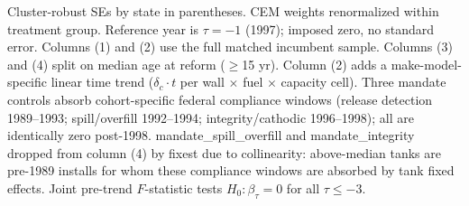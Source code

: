 \par \raggedright 
Cluster-robust SEs by state in parentheses. CEM weights renormalized within treatment group. Reference year is $\tau = -1$ (1997); imposed zero, no standard error. Columns (1) and (2) use the full matched incumbent sample. Columns (3) and (4) split on median age at reform ($\geq$15 yr). Column (2) adds a make-model-specific linear time trend ($\delta_c \cdot t$ per wall $\times$ fuel $\times$ capacity cell). Three mandate controls absorb cohort-specific federal compliance windows (release detection 1989--1993; spill/overfill 1992--1994; integrity/cathodic 1996--1998); all are identically zero post-1998. mandate\_spill\_overfill and mandate\_integrity dropped from column (4) by fixest due to collinearity: above-median tanks are pre-1989 installs for whom these compliance windows are absorbed by tank fixed effects. Joint pre-trend $F$-statistic tests $H_0: \beta_\tau = 0$ for all $\tau \leq -3$.
\par\endgroup


